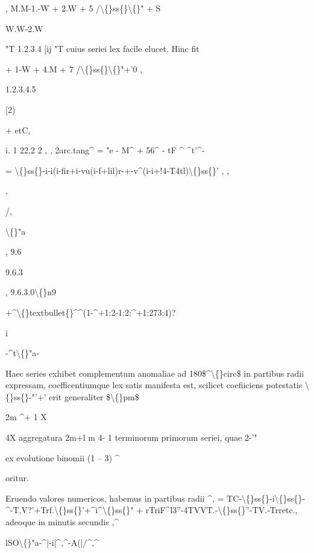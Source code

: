 \documentclass[10pt,a4paper]{article}
\begin{document}
, M.M-1.-W + 2.W + 5 /\textbackslash\{\}ss\{\}\textbackslash\{\}" + S

W.W-2.W

"T
1.2.3.4 [ij
"T
cuius seriei lex facile elucet.
Hinc fit

+ 1-W + 4.M + 7 /\textbackslash\{\}ss\{\}\textbackslash\{\}"+'0 ,

1.2.3.4.5

[2)

+ etC,

i.
1
22,2
2 , ,
2arc.tang\textasciicircum{} = "e - M\textasciicircum{} + 56\textasciicircum{} - tF \textasciicircum{} \textasciicircum{}t'\textasciicircum{}-

= \textbackslash\{\}ss\{\}-i-i(i-fir+i-vu(i-f+lil)r-+-v\textasciicircum{}(i-i+!4-T4tl)\textbackslash\{\}ss\{\}'
, ,

,

/,

\textbackslash\{\}"a

, 9.6

9.6.3

, 9.6.3.0\textbackslash\{\}n9

+\textasciicircum{}\textbackslash\{\}textbullet\{\}\textasciicircum{}\textasciicircum{}(1-\textasciicircum{}+1:2-1:2:\textasciicircum{}+1:273:4)?

i

-\textasciicircum{}t\textbackslash\{\}"a-

Haec series exhibet complementum anomaliae ad 180\$\textasciicircum{}\textbackslash\{\}circ\$ in partibus radii
expressam, coefficentiumque lex satis manifesta est, scilicet coefiiciens potestatis \textbackslash\{\}ss\{\}-"'+' erit generaliter
\$\textbackslash\{\}pm\$

2m \textasciicircum{}+ 1 X

4X aggregatura 2m+l
m 4- 1 terminorum primorum seriei, quae
2-'"

ex evolutione binomii (1 -- 3) \textasciicircum{}

oritur.

Eruendo valores numericos, habemus in partibus radii
\textasciicircum{}, = TC-\textbackslash\{\}ss\{\}-i\textbackslash\{\}ss\{\}-\textasciicircum{}-T,V?'+Trf.\textbackslash\{\}ss\{\}'+\textasciicircum{}i\textasciicircum{}\textbackslash\{\}ss\{\}" + rTriF\textasciicircum{}l3''-4TVVT.-\textbackslash\{\}ss\{\}''-TV.-Trretc.,
adeoque in minutis secundis
,\textasciicircum{}

lSO\textbackslash\{\}"a-\textasciicircum{}|-i|\textasciicircum{},\textasciicircum{}-A(|/\textasciicircum{},\textasciicircum{}
\end{document}
